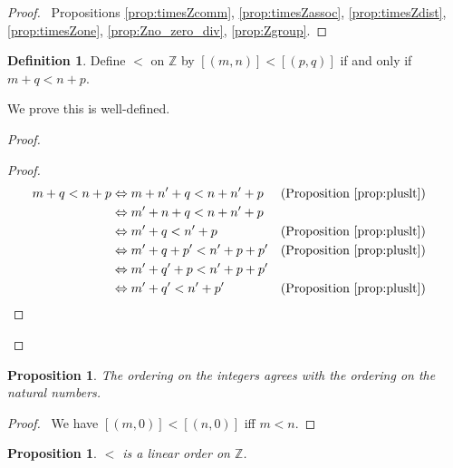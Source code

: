 \documentclass{book}
\let\qed\relax
\newtheorem{prop}[ax]{Proposition}
\theoremstyle{definition}
\newtheorem{df}[ax]{Definition}
\begin{document}
\begin{proof}
\pf\ Propositions \ref{prop:timesZcomm}, \ref{prop:timesZassoc}, \ref{prop:timesZdist}, \ref{prop:timesZone}, \ref{prop:Zno_zero_div}, \ref{prop:Zgroup}. \qed
\end{proof}

\begin{df}
Define $<$ on $\mathbb{Z}$ by $[(m,n)] < [(p,q)]$ if and only if $m + q < n + p$.

We prove this is well-defined.
\end{df}

\begin{proof}
\pf
{}
\begin{proof}
	\pf
	\begin{align*}
		m + q < n + p & \Leftrightarrow m + n' + q < n + n' + p & (\text{Proposition \ref{prop:pluslt}}) \\
		& \Leftrightarrow m' + n + q < n + n' + p \\
		& \Leftrightarrow m' + q < n' + p & (\text{Proposition \ref{prop:pluslt}}) \\
		& \Leftrightarrow m' + q + p' < n' + p + p' & (\text{Proposition \ref{prop:pluslt}}) \\
		& \Leftrightarrow m' + q' + p < n' + p + p' \\
		& \Leftrightarrow m' + q' < n' + p' & (\text{Proposition \ref{prop:pluslt}}) & \qed \\
	\end{align*}
\end{proof}
\end{proof}

\begin{prop}
The ordering on the integers agrees with the ordering on the natural numbers.
\end{prop}

\begin{proof}
\pf\ We have $[(m,0)] < [(n,0)]$ iff $m < n$. \qed
\end{proof}

\begin{prop}
$<$ is a linear order on $\mathbb{Z}$.
\end{prop}
\end{document}
